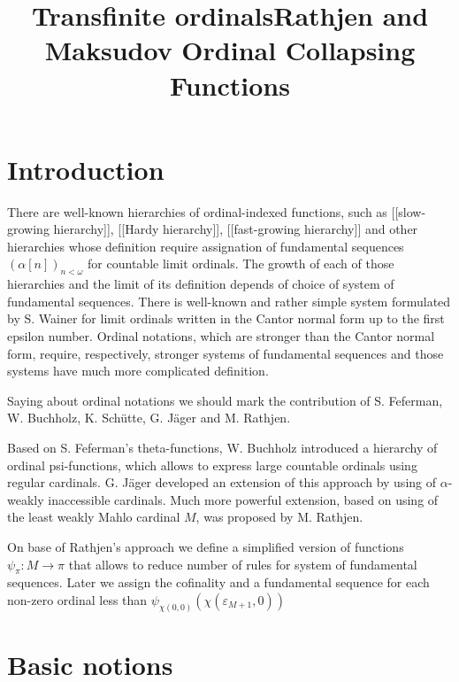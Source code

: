 \documentclass[10pt]{article}
\title{Transfinite ordinals}
\begin{document}
\title{Rathjen and Maksudov Ordinal Collapsing Functions}

\maketitle

\setlength{\parindent}{0pt}

\section{Introduction}

There are well-known hierarchies of ordinal-indexed functions, such as [[slow-growing hierarchy]], [[Hardy hierarchy]], [[fast-growing hierarchy]] and other hierarchies whose definition require assignation of fundamental sequences \((\alpha[n])_{n<\omega}\) for countable limit ordinals. The growth of each of those hierarchies and the limit of its definition depends of choice of system of fundamental sequences. There is well-known and rather simple system formulated by S. Wainer for limit ordinals written in the Cantor normal form up to the first epsilon number. Ordinal notations, which are stronger than the Cantor normal form, require, respectively, stronger systems of fundamental sequences and those systems have much more complicated definition.

Saying about ordinal notations we should mark the contribution of  S. Feferman, W. Buchholz,  K. Schütte, G. Jäger and  M. Rathjen. 

Based on S. Feferman’s theta-functions, W. Buchholz introduced a hierarchy of ordinal psi-functions, which allows to express large countable ordinals using regular cardinals. G. Jäger developed an extension of this approach by using of \(\alpha\)-weakly inaccessible cardinals. Much more powerful extension, based on using of the least weakly Mahlo cardinal \(M\), was proposed by M. Rathjen.  

On base of Rathjen’s approach we define a simplified version of functions  \(\psi_\pi: M\rightarrow \pi\)  that allows to reduce number of rules for system of fundamental sequences. Later we assign the cofinality and a fundamental sequence for each non-zero ordinal less than \(\psi_{\chi(0,0)}(\chi(\varepsilon_{M+1},0))\)


\section{Basic notions}
\end{document}
